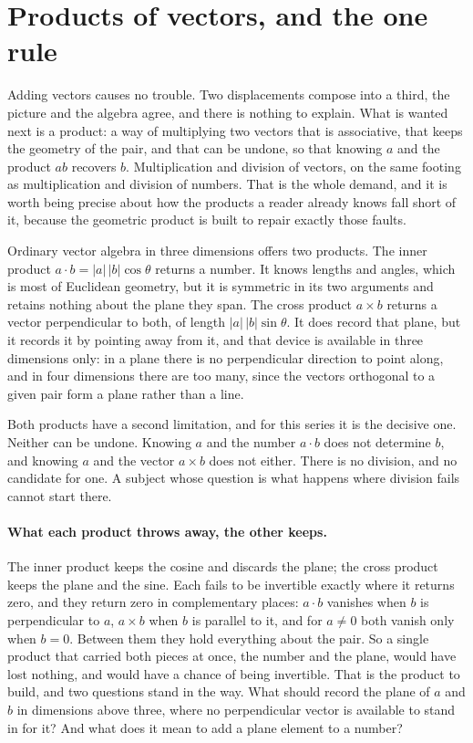 \documentclass[11pt]{article}
\theoremstyle{plain}
\theoremstyle{definition}
\begin{document}
\section{Products of vectors, and the one rule}\label{sec:product}

Adding vectors causes no trouble. Two displacements compose into a third, the picture and the algebra agree, and there is nothing to explain. What is wanted next is a product: a way of multiplying two vectors that is associative, that keeps the geometry of the pair, and that can be undone, so that knowing $a$ and the product $ab$ recovers $b$. Multiplication and division of vectors, on the same footing as multiplication and division of numbers. That is the whole demand, and it is worth being precise about how the products a reader already knows fall short of it, because the geometric product is built to repair exactly those faults.

Ordinary vector algebra in three dimensions offers two products. The inner product $a \cdot b = |a|\,|b| \cos\theta$ returns a number. It knows lengths and angles, which is most of Euclidean geometry, but it is symmetric in its two arguments and retains nothing about the plane they span. The cross product $a \times b$ returns a vector perpendicular to both, of length $|a|\,|b| \sin\theta$. It does record that plane, but it records it by pointing away from it, and that device is available in three dimensions only: in a plane there is no perpendicular direction to point along, and in four dimensions there are too many, since the vectors orthogonal to a given pair form a plane rather than a line.

Both products have a second limitation, and for this series it is the decisive one. Neither can be undone. Knowing $a$ and the number $a \cdot b$ does not determine $b$, and knowing $a$ and the vector $a \times b$ does not either. There is no division, and no candidate for one. A subject whose question is what happens where division fails cannot start there.

\paragraph{What each product throws away, the other keeps.} The inner product keeps the cosine and discards the plane; the cross product keeps the plane and the sine. Each fails to be invertible exactly where it returns zero, and they return zero in complementary places: $a \cdot b$ vanishes when $b$ is perpendicular to $a$, $a \times b$ when $b$ is parallel to it, and for $a \neq 0$ both vanish only when $b = 0$. Between them they hold everything about the pair. So a single product that carried both pieces at once, the number and the plane, would have lost nothing, and would have a chance of being invertible. That is the product to build, and two questions stand in the way. What should record the plane of $a$ and $b$ in dimensions above three, where no perpendicular vector is available to stand in for it? And what does it mean to add a plane element to a number?
\end{document}
